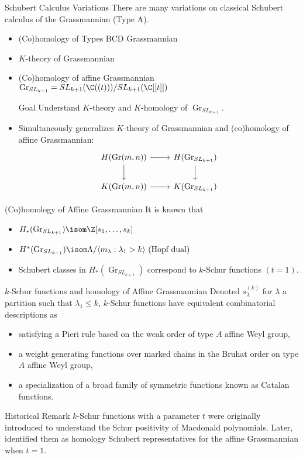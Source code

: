\documentclass{beamer}
\DeclareMathOperator{\Gr}{Gr}
\newcommand{\sym}{\Lambda}
\begin{document}
\begin{frame}[fragile]{Schubert Calculus Variations}
    There are many variations on classical Schubert calculus of
    the Grassmannian (Type A).
  \begin{itemize}
  \item (Co)homology of Types BCD Grassmannian
  \item \(K\)-theory of Grassmannian
  \item (Co)homology of affine Grassmannian \(\Gr_{SL_{k+1}} = SL_{k+1}(\C((t)))/SL_{k+1}(\C[[t]])\)
    \begin{block}{Goal}
      Understand \(K\)-theory and \(K\)-homology of \(\Gr_{SL_{k+1}}\).
    \end{block}
  \item Simultaneously generalizes \(K\)-theory of Grassmannian and
    (co)homology of affine Grassmannian:
    \[
      \begin{tikzcd}
        H(\Gr(m,n)) \ar[d] \ar[r]& H(\Gr_{SL_{k+1}}) \ar[d] \\
        K(\Gr(m,n)) \ar[r] & K(\Gr_{SL_{k+1}})
      \end{tikzcd} 
    \]
  \end{itemize}
\end{frame}
\begin{frame}{(Co)homology of Affine Grassmannian}
  It is known that
  \begin{itemize}
  \item  \( H_*(\Gr_{SL_{k+1}}) \isom \Z[s_1, \ldots, s_k]\) 
  \item \(H^*(\Gr_{SL_{k+1}}) \isom \sym / \langle m_\lambda : \lambda_1 >
    k\rangle \text{ (Hopf dual) }\)
  \item Schubert classes in \(H_*(\Gr_{SL_{k+1}})\) correspond to
    \(k\)-Schur functions \((t=1)\). 
  \end{itemize}
\end{frame}
\begin{frame}{\(k\)-Schur functions and homology of Affine Grassmannian}
  Denoted \(s_\lambda^{(k)}\) for \(\lambda\) a partition such that
  \(\lambda_1 \leq k\), \(k\)-Schur functions have equivalent combinatorial
  descriptions as 
  \begin{itemize}
  \item satisfying a Pieri rule based on the weak order of type \(A\)
    affine Weyl group,
  \item a weight generating functions over marked chains in the Bruhat
    order on type \(A\) affine Weyl group,
  \item a specialization of a broad family of symmetric functions
    known as Catalan functions.
  \end{itemize}
  \begin{block}{Historical Remark}
    \(k\)-Schur functions with a parameter \(t\) were originally
    introduced to understand the Schur positivity of Macdonald
    polynomials. Later,~\cite{Lam} identified them as homology Schubert
    representatives for the affine Grassmannian when \(t=1\).
  \end{block}
\end{frame}
\end{document}
